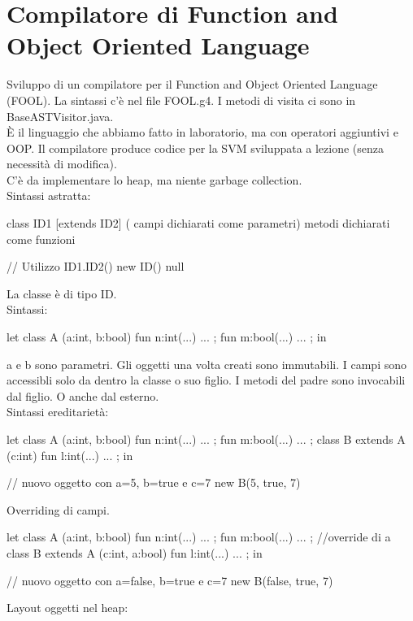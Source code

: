 \documentclass[12pt]{article}
\begin{document}
\section{Compilatore di Function and Object Oriented Language}
Sviluppo di un compilatore per il Function and Object Oriented Language (FOOL). 
La sintassi c'è nel file FOOL.g4.
I metodi di visita ci sono in BaseASTVisitor.java.
\\ È il linguaggio che abbiamo fatto in laboratorio, ma con operatori aggiuntivi e OOP. Il compilatore produce codice per la SVM sviluppata a lezione (senza necessità di modifica).
\\ C'è da implementare lo heap, ma niente garbage collection.
\\ Sintassi astratta:
\begin{mycode}[]
    class ID1 [extends ID2] ( campi dichiarati come parametri) {
        metodi dichiarati come funzioni
    }

    // Utilizzo
    ID1.ID2()
    new ID() 
    null
\end{mycode}
La classe è di tipo ID.
\\ Sintassi: 
\begin{mycode}
    let 
        class A (a:int, b:bool) {
            fun n:int(...) ... ;
            fun m:bool(...) ... ;
        }
    in  
\end{mycode}
a e b sono parametri. Gli oggetti una volta creati sono immutabili. I campi sono accessibli solo da dentro la classe o suo figlio. I metodi del padre sono invocabili dal figlio. O anche dal esterno.
\\ Sintassi ereditarietà:
\newpage
\begin{mycode}
    let 
        class A (a:int, b:bool) {
            fun n:int(...) ... ;
            fun m:bool(...) ... ;
        }
        class B extends A (c:int) {
            fun l:int(...) ... ;
        }
    in

    // nuovo oggetto con a=5, b=true e c=7
    new B(5, true, 7)
\end{mycode}
Overriding di campi.
\begin{mycode}
    let 
        class A (a:int, b:bool) {
            fun n:int(...) ... ;
            fun m:bool(...) ... ;
        }
        //override di a
        class B extends A (c:int, a:bool) {
            fun l:int(...) ... ;
        }
    in

    // nuovo oggetto con a=false, b=true e c=7
    new B(false, true, 7)
\end{mycode}
Layout oggetti nel heap: 
\end{document}
